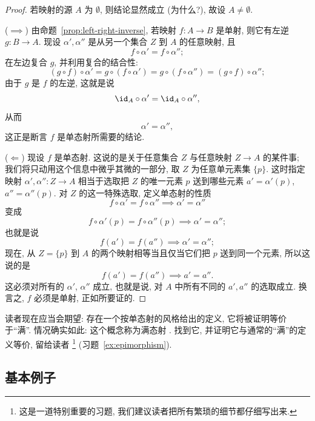 \begin{proof}
若映射的源 $A$ 为 $\emptyset$, 则结论显然成立 (为什么?), 故设 $A \neq \emptyset$.

($\implies$) 由命题~\ref{prop:left-right-inverse}, 若映射 $f : A \to B$ 是单射, 则它有左逆 $g : B \to A$. 现设 $\alpha', \alpha''$ 是从另一个集合 $Z$ 到 $A$ 的任意映射, 且
\[
f \circ \alpha' = f \circ \alpha'';
\]
在左边复合 $g$, 并利用复合的结合性:
\[
(g \circ f) \circ \alpha' = g \circ (f \circ \alpha') = g \circ (f \circ \alpha'') = (g \circ f) \circ \alpha'';
\]
由于 $g$ 是 $f$ 的左逆, 这就是说
\[
\id_A \circ \alpha' = \id_A \circ \alpha'',
\]
从而
\[
\alpha' = \alpha'',
\]
这正是断言 $f$ 是单态射所需要的结论.

($\Leftarrow$) 现设 $f$ 是单态射. 这说的是关于任意集合 $Z$ 与任意映射 $Z \to A$ 的某件事; 我们将只动用这个信息中微乎其微的一部分, 取 $Z$ 为任意单元素集 $\{p\}$. 这时指定映射 $\alpha', \alpha'' : Z \to A$ 相当于选取把 $Z$ 的唯一元素 $p$ 送到哪些元素 $a' = \alpha'(p)$, $a'' = \alpha''(p)$. 对 $Z$ 的这一特殊选取, 定义单态射的性质
\[
f \circ \alpha' = f \circ \alpha'' \implies \alpha' = \alpha''
\]
变成
\[
f \circ \alpha'(p) = f \circ \alpha''(p) \implies \alpha' = \alpha'';
\]
也就是说
\[
f(a') = f(a'') \implies \alpha' = \alpha'';
\]
现在, 从 $Z = \{p\}$ 到 $A$ 的两个映射相等当且仅当它们把 $p$ 送到同一个元素, 所以这说的是
\[
f(a') = f(a'') \implies a' = a''.
\]
这必须对所有的 $\alpha'$, $\alpha''$ 成立, 也就是说, 对 $A$ 中所有不同的 $a', a''$ 的选取成立. 换言之, $f$ 必须是单射, 正如所要证的.
\end{proof}

读者现在应当会期望: 存在一个按单态射的风格给出的定义, 它将被证明等价于``满''. 情况确实如此: 这个概念称为满态射%
. 找到它, 并证明它与通常的``满''的定义等价, 留给读者%
\footnote{这是一道特别重要的习题, 我们建议读者把所有繁琐的细节都仔细写出来.}%
 (习题~\ref{ex:epimorphism}).

\subsection{基本例子}
\label{subsec:basic-examples}

